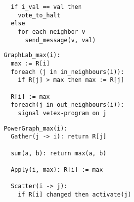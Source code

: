 \documentclass[12pt]{article}
\begin{document}
\begin{enumerate}
\begin{verbatim}
	  if i_val == val then
	    vote_to_halt
	  else
	    for each neighbor v
	      send_message(v, val)
	\end{verbatim}

	\begin{verbatim}
	GraphLab_max(i):
	  max := R[i]
	  foreach (j in in_neighbours(i)):
	    if R[j] > max then max := R[j]
			
	  R[i] := max
	  foreach(j in out_neighbours(i)):
	    signal vetex-program on j
	\end{verbatim}

	\begin{verbatim}
	PowerGraph_max(i):
	  Gather(j -> i): return R[j]
	  
	  sum(a, b): return max(a, b)
	  
	  Apply(i, max): R[i] := max
	  
	  Scatter(i -> j):
	    if R[i] changed then activate(j)
	\end{verbatim}

\end{enumerate}
\end{document}

